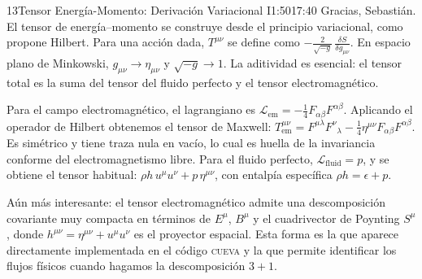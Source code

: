 \documentclass[11pt,a4paper]{article}
\begin{document}
\begin{bryorador}{13}{Tensor Energía-Momento: Derivación Variacional I}{1:50}{17:40}
Gracias, Sebastián. El tensor de energía--momento se construye desde el
principio variacional, como propone Hilbert. Para una acción dada,
$T^{\mu\nu}$ se define como $-\frac{2}{\sqrt{-g}}\,\frac{\delta S}
{\delta g_{\mu\nu}}$. En espacio plano de Minkowski, $g_{\mu\nu}\to
\eta_{\mu\nu}$ y $\sqrt{-g}\to 1$. La aditividad es esencial: el tensor total
es la suma del tensor del fluido perfecto y el tensor electromagnético.

Para el campo electromagnético, el lagrangiano es
$\mathcal{L}_\text{em}=-\tfrac{1}{4}F_{\alpha\beta}F^{\alpha\beta}$. Aplicando
el operador de Hilbert obtenemos el tensor de Maxwell:
$T^{\mu\nu}_\text{em}=F^{\mu\lambda}F^\nu{}_\lambda-\tfrac{1}{4}\eta^{\mu\nu}
F_{\alpha\beta}F^{\alpha\beta}$. Es simétrico y tiene traza nula en vacío, lo
cual es huella de la invariancia conforme del electromagnetismo libre. Para
el fluido perfecto, $\mathcal{L}_\text{fluid}=p$, y se obtiene el tensor
habitual: $\rho h\,u^\mu u^\nu+p\,\eta^{\mu\nu}$, con entalpía específica
$\rho h=\epsilon+p$.

Aún más interesante: el tensor electromagnético admite una descomposición
covariante muy compacta en términos de $E^\mu$, $B^\mu$ y el cuadrivector de
Poynting $S^\mu$, donde $h^{\mu\nu}=\eta^{\mu\nu}+u^\mu u^\nu$ es el
proyector espacial. Esta forma es la que aparece directamente implementada
en el código \textsc{cueva} y la que permite identificar los flujos físicos
cuando hagamos la descomposición $3+1$.
\end{bryorador}
\end{document}
